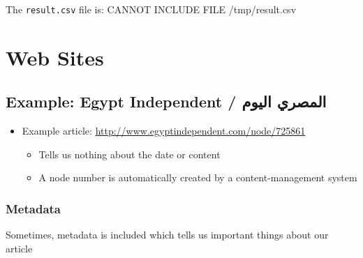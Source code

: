 \documentclass[11pt]{article}
\begin{document}
The \texttt{result.csv} file is:
CANNOT INCLUDE FILE /tmp/result.csv
\section{Web Sites}
\label{sec-4}
\subsection{Example: Egypt Independent / المصري اليوم}
\label{sec-4-1}

\begin{itemize}
\item Example article: \href{http://www.egyptindependent.com/node/725861}{http://www.egyptindependent.com/node/725861}
\begin{itemize}
\item Tells us nothing about the date or content
\item A node number is automatically created by a content-management
    system
\end{itemize}
\end{itemize}
\subsubsection{Metadata}
\label{sec-4-1-1}

Sometimes, metadata is included which tells us important things
about our article
\end{document}
